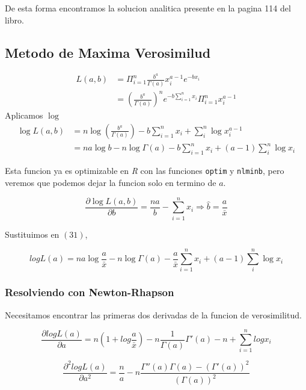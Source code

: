 \documentclass{article}
\begin{document}
    De esta forma encontramos la solucion analitica presente en la pagina 114 del libro.
    \subsection{Metodo de Maxima Verosimilud}
    \begin{align}
        L(a, b) &= \Pi_{i=1}^{n} \frac{b^a}{\Gamma(a)} x_{i}^{a-1} e^{-bx_i}\\
                &= \left(\frac{b^a}{\Gamma (a)}\right)^n e^{-b\sum_{i=1}^{n}x_i} \Pi_{i=1}^n x_i^{a-1}
    \end{align}
    Aplicamos $\log$
    \begin{align}
        \log L(a,b) &= n\log\left(\frac{b^a}{\Gamma (a)}\right ) -b\sum_{i=1}^{n}x_i + \sum_{i}^{n} \log x_i^{a-1} \\
                    &= na\log b - n\log\Gamma(a) -b\sum_{i=1}^{n}x_i + (a-1)\sum_{i}^{n} \log x_i
    \end{align}

    Esta funcion ya es optimizable en \textit{R} con las funciones \verb|optim| y \verb|nlminb|, pero veremos que podemos dejar la funcion solo en termino de $a$.

    \begin{equation}
        \frac{\partial \log L(a, b)}{\partial b} = \frac{na}{b}-\sum_{i=1}^nx_i \Rightarrow \hat{b} = \frac{a}{\bar{x}} 
    \end{equation}

    Sustituimos en $(31)$,

    \begin{equation}
        log L(a) = na\log \frac{a}{\bar{x}} - n\log\Gamma(a) - \frac{a}{\bar{x}}\sum_{i=1}^{n}x_i + (a-1)\sum_{i}^{n} \log x_i
    \end{equation}

    \subsubsection{Resolviendo con Newton-Rhapson}
    Necesitamos encontrar las primeras dos derivadas de la funcion de verosimilitud.

    \begin{equation}
        \frac{\partial log L(a)}{\partial a} = n (1 + log\frac{a}{\bar{x}}) -n \frac{1}{\Gamma (a)} \Gamma'(a) - n + \sum_{i=1}^{n} log x_i
    \end{equation}

    \begin{equation}
        \frac{\partial^2 logL(a)}{\partial a^2}= \frac{n}{a} - n\frac{\Gamma ''(a)\Gamma (a) - (\Gamma ' (a))^2}{(\Gamma (a))^2}
    \end{equation}
\end{document}
